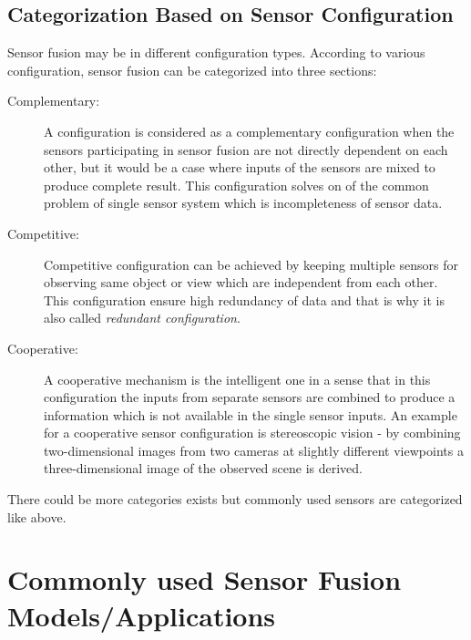 \subsection{Categorization Based on Sensor Configuration}
Sensor fusion may be in different configuration types. According to various configuration, sensor fusion can be categorized into three sections\cite{Wilfried2002}:
\begin{description}
    \item[Complementary:] A configuration is considered as a complementary configuration when the sensors participating in sensor fusion are not directly dependent on each other, but it would be a case where inputs of the sensors are mixed to produce complete result. This configuration solves on of the common problem of single sensor system which is incompleteness of sensor data.
    \item[Competitive:] Competitive configuration can be achieved by keeping multiple sensors for observing same object or view which are independent from each other. This configuration ensure high redundancy of data and that is why it is also called \emph{redundant configuration}\cite{Wilfried2002}.
    \item[Cooperative:] A cooperative mechanism is the intelligent one in a sense that in this configuration the inputs from separate sensors are combined to produce a information which is not available in the single sensor inputs. An example for a cooperative sensor configuration is stereoscopic vision - by combining two-dimensional images from two cameras at slightly different viewpoints a three-dimensional image of the observed scene is derived\cite{Wilfried2002}.
\end{description}

There could be more categories exists but commonly used sensors are categorized like above. 

\section{Commonly used Sensor Fusion Models/Applications}


